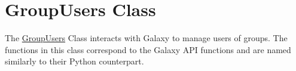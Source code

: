 \hypertarget{group__group__users__class}{}\section{Group\+Users Class}
\label{group__group__users__class}
The \hyperlink{classGroupUsers}{Group\+Users} Class interacts with Galaxy to manage users of groups. The functions in this class correspond to the Galaxy A\+PI functions and are named similarly to their Python counterpart. 